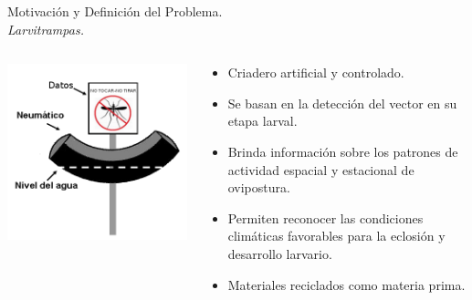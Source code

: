 \begin{frame}[t]{Motivación y Definición del Problema.\\\textit{Larvitrampas.}}
\begin{center}
\begin{columns}[c]
\begin{column}[c]{3cm}
          \includegraphics[width=\textwidth]{../book/anexos/graphics/disenho-2.png}
        \end{column}
        \begin{column}[c]{7cm}
          \begin{itemize}
            \item Criadero artificial y controlado.
            \item Se basan en la detección del vector en su etapa larval.
            \item Brinda información sobre los patrones de actividad espacial y estacional de ovipostura.
            \item Permiten reconocer las condiciones climáticas favorables para la eclosión y desarrollo larvario.
            \item Materiales reciclados como materia prima.
          \end{itemize}
        \end{column}
      \end{columns}
  \end{center}
\end{frame}

